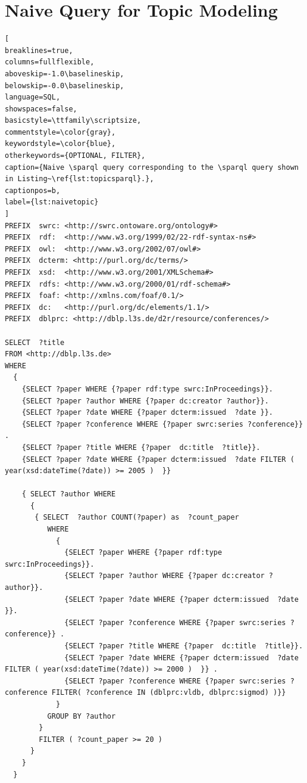 \vspace*{5pt}
\pagebreak
\section{Naive \sparql Query for Topic Modeling}
\label{app:naiveQuery2}
\hfill

\begin{lstlisting}[
breaklines=true,
columns=fullflexible,
aboveskip=-1.0\baselineskip,
belowskip=-0.0\baselineskip,
language=SQL,
showspaces=false,
basicstyle=\ttfamily\scriptsize,
commentstyle=\color{gray},
keywordstyle=\color{blue},
otherkeywords={OPTIONAL, FILTER},
caption={Naive \sparql query corresponding to the \sparql query shown in Listing~\ref{lst:topicsparql}.},
captionpos=b,
label={lst:naivetopic}
]
PREFIX  swrc: <http://swrc.ontoware.org/ontology#>
PREFIX  rdf:  <http://www.w3.org/1999/02/22-rdf-syntax-ns#>
PREFIX  owl:  <http://www.w3.org/2002/07/owl#>
PREFIX  dcterm: <http://purl.org/dc/terms/>
PREFIX  xsd:  <http://www.w3.org/2001/XMLSchema#>
PREFIX  rdfs: <http://www.w3.org/2000/01/rdf-schema#>
PREFIX  foaf: <http://xmlns.com/foaf/0.1/>
PREFIX  dc:   <http://purl.org/dc/elements/1.1/>
PREFIX  dblprc: <http://dblp.l3s.de/d2r/resource/conferences/>

SELECT  ?title
FROM <http://dblp.l3s.de>
WHERE
  { 
    {SELECT ?paper WHERE {?paper rdf:type swrc:InProceedings}}.
    {SELECT ?paper ?author WHERE {?paper dc:creator ?author}}.       
    {SELECT ?paper ?date WHERE {?paper dcterm:issued  ?date }}.   
    {SELECT ?paper ?conference WHERE {?paper swrc:series ?conference}} .
    {SELECT ?paper ?title WHERE {?paper  dc:title  ?title}}.
    {SELECT ?paper ?date WHERE {?paper dcterm:issued  ?date FILTER ( year(xsd:dateTime(?date)) >= 2005 )  }}

    { SELECT ?author WHERE
      {
       { SELECT  ?author COUNT(?paper) as  ?count_paper
          WHERE
            {
              {SELECT ?paper WHERE {?paper rdf:type swrc:InProceedings}}.
              {SELECT ?paper ?author WHERE {?paper dc:creator ?author}}.       
              {SELECT ?paper ?date WHERE {?paper dcterm:issued  ?date }}.   
              {SELECT ?paper ?conference WHERE {?paper swrc:series ?conference}} .
              {SELECT ?paper ?title WHERE {?paper  dc:title  ?title}}.
              {SELECT ?paper ?date WHERE {?paper dcterm:issued  ?date FILTER ( year(xsd:dateTime(?date)) >= 2000 )  }} .
              {SELECT ?paper ?conference WHERE {?paper swrc:series ?conference FILTER( ?conference IN (dblprc:vldb, dblprc:sigmod) )}}
            }
          GROUP BY ?author
        }
        FILTER ( ?count_paper >= 20 ) 
      }
    }
  }
\end{lstlisting}
